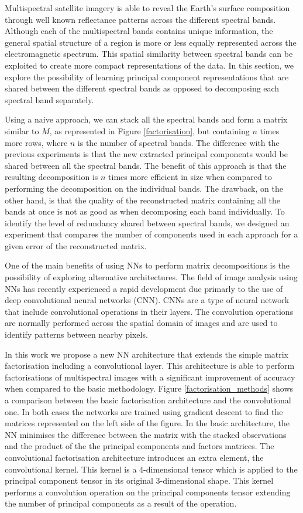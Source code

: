 \documentclass[essd, manuscript]{copernicus}
\begin{document}
Multispectral satellite imagery is able to reveal the Earth's surface composition through well known reflectance patterns across the different spectral bands. Although each of the multispectral bands contains unique information, the general spatial structure of a region is more or less equally represented across the electromagnetic spectrum. This spatial similarity between spectral bands can be exploited to create more compact representations of the data. In this section, we explore the possibility of learning principal component representations that are shared between the different spectral bands as opposed to decomposing each spectral band separately.

Using a naive approach, we can stack all the spectral bands and form a matrix similar to $M$, as represented in Figure \ref{factorisation}, but containing $n$ times more rows, where $n$ is the number of spectral bands. The difference with the previous experiments is that the new extracted principal components would be shared between all the spectral bands. The benefit of this approach is that the resulting decomposition is $n$ times more efficient in size when compared to performing the decomposition on the individual bands. The drawback, on the other hand, is that the quality of the reconstructed matrix containing all the bands at once is not as good as when decomposing each band individually. To identify the level of redundancy shared between spectral bands, we designed an experiment that compares the number of components used in each approach for a given error of the reconstructed matrix. 

One of the main benefits of using NNs to perform matrix decompositions is the possibility of exploring alternative architectures. The field of image analysis using NNs has recently experienced a rapid development due primarly to the use of deep convolutional neural networks (CNN). CNNs are a type of neural network that include convolutional operations in their layers. The convolution operations are normally performed across the spatial domain of images and are used to identify patterns between nearby pixels.

In this work we propose a new NN architecture that extends the simple matrix factorisation including a convolutional layer. This architecture is able to perform factorisations of multispectral images with a significant improvement of accuracy when compared to the basic methodology. Figure \ref{factorisation_methods} shows a comparison between the basic factorisation architecture and the convolutional one. In both cases the networks are trained using gradient descent to find the matrices represented on the left side of the figure. In the basic architecture, the NN minimises the difference between the matrix with the stacked observations and the product of the the principal components and factors matrices. The convolutional factorisation architecture introduces an extra element, the convolutional kernel. This kernel is a 4-dimensional tensor which is applied to the principal component tensor in its original 3-dimensional shape. This kernel performs a convolution operation on the principal components tensor extending the number of principal components as a result of the operation. 
\end{document}
